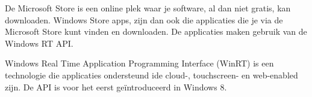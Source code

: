 De Microsoft Store is een online plek waar je software, al dan niet gratis, kan downloaden. Windows Store apps, zijn dan ook die applicaties die je via de Microsoft Store kunt vinden en downloaden. De applicaties maken gebruik van de Windows RT API.

Windows Real Time Application Programming Interface (WinRT) is een technologie die applicaties ondersteund ide cloud-, touchscreen- en web-enabled zijn. De API is voor het eerst ge\"introduceerd in Windows 8.

